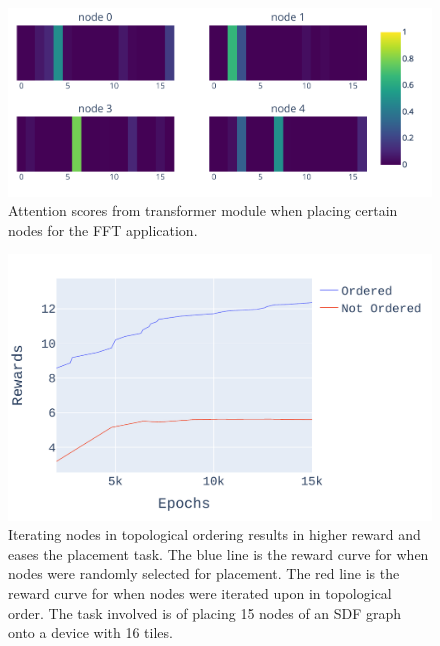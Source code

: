 \begin{figure}[tb]
  \centering
  \includegraphics[width=\linewidth]{fig/ifft_attention.pdf}
  \caption{Attention scores from transformer module when placing certain nodes for the FFT application. }
  \label{fig:ifft_attention}
\end{figure}

\begin{figure}[tb]
  \centering
  \includegraphics[width=\linewidth]{fig/plot_ordered.pdf}
  \caption{Iterating nodes in topological ordering results in higher reward and eases the placement task. 
 The blue line is the reward curve for when nodes were randomly selected for placement. 
 The red line is the reward curve for when nodes were iterated upon in topological order. 
 The task involved is of placing 15 nodes of an SDF graph onto a device with 16 tiles.}
  \label{fig:ordered_placement}
\end{figure}

